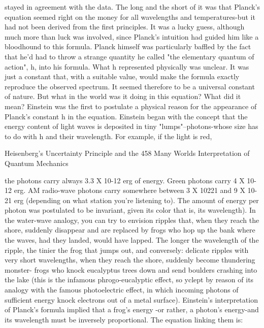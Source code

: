 stayed in agreement with the data. The long and the short of it was that Planck's
equation seemed right on the money for all wavelengths and temperatures-but it had
not been derived from the first principles. It was a lucky guess, although much more
than luck was involved, since Planck's intuition had guided him like a bloodhound to
this formula.
        Planck himself was particularly baffled by the fact that he'd had to throw a
strange quantity he called "the elementary quantum of action", h, into his formula.
What h represented physically was unclear. It was just a constant that, with a suitable
value, would make the formula exactly reproduce the observed spectrum. It seemed
therefore to be a universal constant of nature.
        But what in the world was it doing in this equation? What did it mean?
Einstein was the first to postulate a physical reason for the appearance of Planck's
constant h in the equation. Einstein began with the concept that the energy content of
light waves is deposited in tiny "lumps"--photons-whose size has to do with h and
their wavelength. For example, if the light is red,




Heisenberg's Uncertainty Principle and the                                            458
Many Worlds Interpretation of Quantum Mechanics

the photons carry always 3.3 X 10-12 erg of energy. Green photons carry 4 X 10-12 erg.
AM radio-wave photons carry somewhere between 3 X 10221 and 9 X 10-21 erg
(depending on what station you're listening to). The amount of energy per photon was
postulated to be invariant, given its color that is, its wavelength).
        In the water-wave analogy, you can try to envision ripples that, when they
reach the shore, suddenly disappear and are replaced by frogs who hop up the bank
where the waves, had they landed, would have lapped. The longer the wavelength of
the ripple, the tinier the frog that jumps out, and conversely: delicate ripples with very
short wavelengths, when they reach the shore, suddenly become thundering monster-
frogs who knock eucalyptus trees down and send boulders crashing into the lake (this
is the infamous phrogo-eucalyptic effect, so yclept by reason of its analogy with the
famous photoelectric effect, in which incoming photons of sufficient energy knock
electrons out of a metal surface).
        Einstein's interpretation of Planck's formula implied that a frog's energy -or
rather, a photon's energy-and its wavelength must be inversely proportional. The
equation linking them is:

